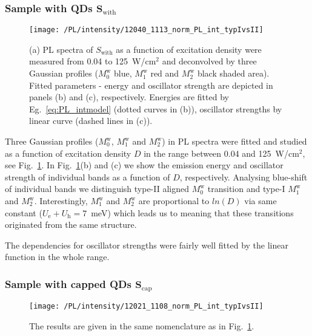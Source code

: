\subsubsection*{Sample with QDs $\mathbf{S_\mathrm{with}}$}
\begin{figure}
	\centering
	\texttt{[image: /PL/intensity/12040\_1113\_norm\_PL\_int\_typIvsII]}
	\caption{(a) PL spectra of $S_\mathrm{with}$ as a function of excitation density were measured from 0.04 to 125~W/cm$^2$ and deconvolved by three Gaussian profiles ($M_0^\mathrm{w}$ blue, $M_1^\mathrm{w}$ red and $M_2^\mathrm{w}$ black shaded area). Fitted parameters - energy and oscillator strength are depicted in panels (b) and (c), respectively. Energies are fitted by Eg.~\ref{eq:PL_intmodel} (dotted curves in (b)), oscillator strengths by linear curve (dashed lines in (c)).}
	\label{fig:QD_w_int}
\end{figure}

Three Gaussian profiles ($M_0^\mathrm{w}$, $M_1^\mathrm{w}$ and $M_2^\mathrm{w}$) in PL spectra were fitted and studied as a function of excitation density $D$ in the range between 0.04 and 125~W/cm$^2$, see Fig.~\ref{fig:QD_w_int}. In Fig.~\ref{fig:QD_w_int}(b) and (c) we show the emission energy and oscillator strength of individual bands as a function of $D$, respectively. Analysing blue-shift of individual bands we distinguish type-II aligned $M_0^\mathrm{w}$ transition and type-I $M_1^\mathrm{w}$ and $M_2^\mathrm{w}$. Interestingly, $M_1^\mathrm{w}$ and $M_2^\mathrm{w}$ are proportional to $ln(D)$ via same constant ($U_\mathrm{e}+U_\mathrm{h}=7$~meV) which leads us to meaning that these transitions originated from the same structure. 

The dependencies for oscillator strengths were fairly well fitted by the linear function in the whole range.




\subsubsection*{Sample with capped QDs $\mathbf{S_\mathrm{cap}}$}
\begin{figure}
	\centering
	\texttt{[image: /PL/intensity/12021\_1108\_norm\_PL\_int\_typIvsII]}
	\caption{The results are given in the same nomenclature as in Fig.~\ref{fig:QD_w_int}.}
	\label{fig:QD_cap_int}
\end{figure}

